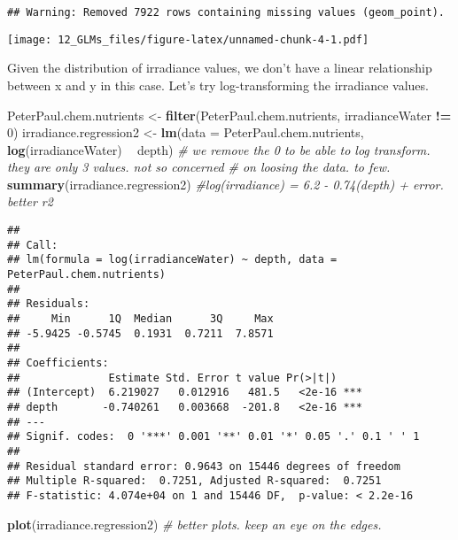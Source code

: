 \documentclass[]{article}
\newenvironment{Shaded}{\begin{snugshade}}{\end{snugshade}}
\newcommand{\KeywordTok}[1]{\textcolor[rgb]{0.13,0.29,0.53}{\textbf{#1}}}
\newcommand{\DataTypeTok}[1]{\textcolor[rgb]{0.13,0.29,0.53}{#1}}
\newcommand{\DecValTok}[1]{\textcolor[rgb]{0.00,0.00,0.81}{#1}}
\newcommand{\StringTok}[1]{\textcolor[rgb]{0.31,0.60,0.02}{#1}}
\newcommand{\CommentTok}[1]{\textcolor[rgb]{0.56,0.35,0.01}{\textit{#1}}}
\newcommand{\OperatorTok}[1]{\textcolor[rgb]{0.81,0.36,0.00}{\textbf{#1}}}
\newcommand{\NormalTok}[1]{#1}
\begin{document}
\begin{verbatim}
## Warning: Removed 7922 rows containing missing values (geom_point).
\end{verbatim}

\texttt{[image: 12\_GLMs\_files/figure-latex/unnamed-chunk-4-1.pdf]}

Given the distribution of irradiance values, we don't have a linear
relationship between x and y in this case. Let's try log-transforming
the irradiance values.

\begin{Shaded}
\begin{Highlighting}[]
\NormalTok{PeterPaul.chem.nutrients <-}\StringTok{ }\KeywordTok{filter}\NormalTok{(PeterPaul.chem.nutrients, irradianceWater }\OperatorTok{!=}\StringTok{ }\DecValTok{0}\NormalTok{)}
\NormalTok{irradiance.regression2 <-}\StringTok{ }\KeywordTok{lm}\NormalTok{(}\DataTypeTok{data =}\NormalTok{ PeterPaul.chem.nutrients, }\KeywordTok{log}\NormalTok{(irradianceWater) }\OperatorTok{~}\StringTok{ }\NormalTok{depth) }
\CommentTok{# we remove the 0 to be able to log  transform. they are only 3 values. not so concerned }
\CommentTok{# on loosing the data. to few.}
\KeywordTok{summary}\NormalTok{(irradiance.regression2) }\CommentTok{#log(irradiance) = 6.2 - 0.74(depth) + error. better r2}
\end{Highlighting}
\end{Shaded}

\begin{verbatim}
## 
## Call:
## lm(formula = log(irradianceWater) ~ depth, data = PeterPaul.chem.nutrients)
## 
## Residuals:
##     Min      1Q  Median      3Q     Max 
## -5.9425 -0.5745  0.1931  0.7211  7.8571 
## 
## Coefficients:
##              Estimate Std. Error t value Pr(>|t|)    
## (Intercept)  6.219027   0.012916   481.5   <2e-16 ***
## depth       -0.740261   0.003668  -201.8   <2e-16 ***
## ---
## Signif. codes:  0 '***' 0.001 '**' 0.01 '*' 0.05 '.' 0.1 ' ' 1
## 
## Residual standard error: 0.9643 on 15446 degrees of freedom
## Multiple R-squared:  0.7251, Adjusted R-squared:  0.7251 
## F-statistic: 4.074e+04 on 1 and 15446 DF,  p-value: < 2.2e-16
\end{verbatim}

\begin{Shaded}
\begin{Highlighting}[]
\KeywordTok{plot}\NormalTok{(irradiance.regression2) }\CommentTok{# better plots. keep an eye on the edges.}
\end{Highlighting}
\end{Shaded}
\end{document}

